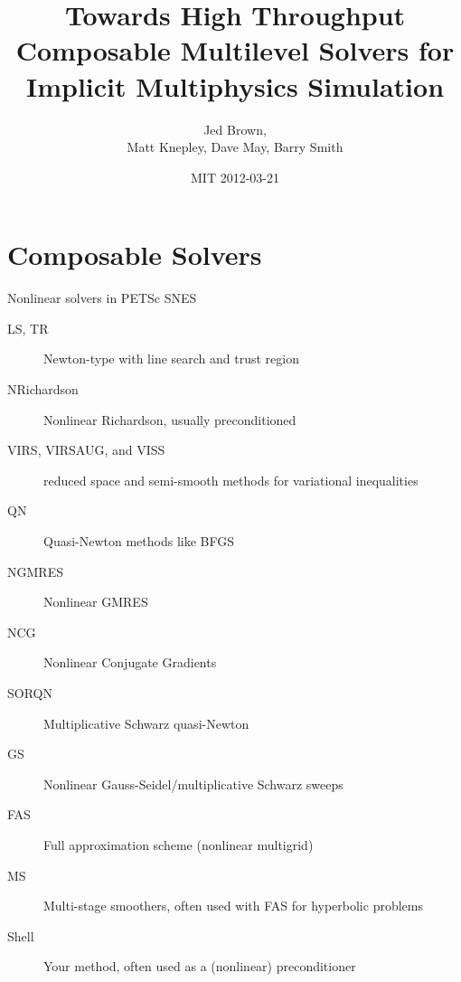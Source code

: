 \documentclass{beamer}
\title{Towards High Throughput Composable Multilevel Solvers for Implicit Multiphysics Simulation}
\author{Jed Brown\inst{1},\\
Matt Knepley\inst{2}, Dave May\inst{3}, Barry Smith\inst{1}}
\institute
{
  \inst{1}{Mathematics and Computer Science Division, Argonne National Laboratory} \\
  \inst{2}{Computation Institute, University of Chicago} \\
  \inst{3}{ETH Z\"urich}
}
\date{MIT 2012-03-21}
\begin{document}
\lstset{language=C}
\normalem

\begin{frame}
  \titlepage
\end{frame}



\section{Composable Solvers}










\begin{frame}{Nonlinear solvers in PETSc SNES}
  \begin{description}
  \item[LS, TR] Newton-type with line search and trust region
  \item[NRichardson] Nonlinear Richardson, usually preconditioned
  \item[VIRS, VIRSAUG, and VISS] reduced space and semi-smooth methods for variational inequalities
  \item[QN] Quasi-Newton methods like BFGS
  \item[NGMRES] Nonlinear GMRES
  \item[NCG] Nonlinear Conjugate Gradients
  \item[SORQN] Multiplicative Schwarz quasi-Newton
  \item[GS] Nonlinear Gauss-Seidel/multiplicative Schwarz sweeps
  \item[FAS] Full approximation scheme (nonlinear multigrid)
  \item[MS] Multi-stage smoothers, often used with FAS for hyperbolic problems
  \item[Shell] Your method, often used as a (nonlinear) preconditioner
  \end{description}
\end{frame}



\end{document}

